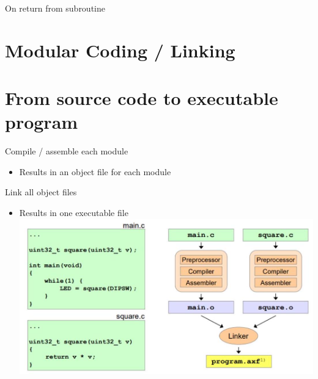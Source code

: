 \documentclass[10pt]{article}
\begin{document}
On return from subroutine

\section*{Modular Coding / Linking}
\section*{From source code to executable program}
Compile / assemble each module

\begin{itemize}
  \item Results in an object file for each module
\end{itemize}

Link all object files

\begin{itemize}
  \item Results in one executable file\\
\includegraphics[width=\linewidth]{images/2024_12_29_79e6b22f503fb7b4f718g-10(2)}
\end{itemize}
\end{document}
